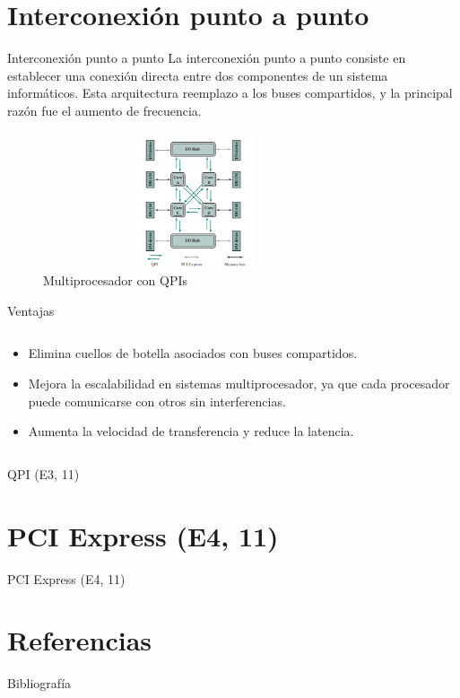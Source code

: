 \documentclass[presentation]{beamer}
\begin{document}
\section{Interconexión punto a punto}
\label{sec:orgcf58319}
\begin{frame}[label={sec:org955de72}]{Interconexión punto a punto}
La interconexión punto a punto consiste en establecer una conexión directa entre dos componentes de un sistema informáticos.
Esta arquitectura reemplazo a los buses compartidos, y la principal razón fue el aumento de frecuencia.

\begin{figure}[!h]
   \vspace{-0.1cm}
   \centering
   \includegraphics[height=4cm, width=0.8\textwidth]{./Images/image1.png}
   \vspace{-0.5cm} %
   \caption{Multiprocesador con QPIs}
   \label{fig:Representacion}
\end{figure}
\end{frame}

\begin{frame}[label={sec:orga4799d7}]{Ventajas}
\begin{columns}
\begin{column}{0.8\columnwidth}
\begin{itemize}
\item Elimina cuellos de botella asociados con buses compartidos.
\item Mejora la escalabilidad en sistemas multiprocesador, ya que cada procesador puede comunicarse con otros sin interferencias.
\item Aumenta la velocidad de transferencia y reduce la latencia.
\end{itemize}
\end{column}
\end{columns}
\end{frame}
\begin{frame}[label={sec:org21f1918}]{QPI (E3, 11)}
\end{frame}
\section{PCI Express (E4, 11)}
\label{sec:org17f79be}
\begin{frame}[label={sec:org319bfb8}]{PCI Express (E4, 11)}
\end{frame}
\section{Referencias}
\label{sec:orga20d0f7}
\begin{frame}[allowframebreaks]{Bibliografía}
\printbibliography
\end{frame}
\end{document}
